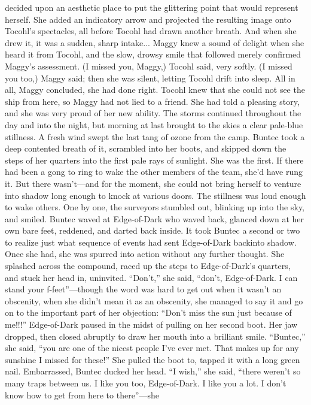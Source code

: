 \documentclass[9pt]{article}
\begin{document}
decided upon an aesthetic place to put the glittering point that would represent herself. She added an
indicatory arrow and projected the resulting image onto Tocohl’s spectacles, all before Tocohl had
drawn another breath.
And when she drew it, it was a sudden, sharp intake... Maggy knew a sound of delight when she
heard it from Tocohl, and the slow, drowsy smile that followed merely confirmed Maggy’s assessment.
(I missed you, Maggy,) Tocohl said, very softly.
(I missed you too,) Maggy said; then she was silent, letting Tocohl drift into sleep.
All in all, Maggy concluded, she had done right. Tocohl knew that she could not see the ship from
here, so Maggy had not lied to a friend. She had told a pleasing story, and she was very proud of her
new ability.
The storms continued throughout the day and into the night, but morning at last brought to the skies a
clear pale-blue stillness. A fresh wind swept the last tang of ozone from the camp. Buntec took a deep
contented breath of it, scrambled into her boots, and skipped down the steps of her quarters into the first
pale rays of sunlight.
She was the first. If there had been a gong to ring to wake the other members of the team, she’d
have rung it. But there wasn’t—and for the moment, she could not bring herself to venture into shadow
long enough to knock at various doors.
The stillness was loud enough to wake others. One by one, the surveyors stumbled out, blinking up
into the sky, and smiled. Buntec waved at Edge-of-Dark who waved back, glanced down at her own
bare feet, reddened, and darted back inside.
It took Buntec a second or two to realize just what sequence of events had sent Edge-of-Dark backinto shadow. Once she had, she was spurred into action without any further thought.
She splashed across the compound, raced up the steps to Edge-of-Dark’s quarters, and stuck her
head in, uninvited. “Don’t,” she said, “don’t, Edge-of-Dark. I can stand your f-feet”—though the word
was hard to get out when it wasn’t an obscenity, when she didn’t mean it as an obscenity, she managed
to say it and go on to the important part of her objection: “Don’t miss the sun just because of me!!!”
Edge-of-Dark paused in the midst of pulling on her second boot. Her jaw dropped, then closed
abruptly to draw her mouth into a brilliant smile. “Buntec,” she said, “you are one of the nicest people
I’ve ever met. That makes up for any sunshine I missed for these!” She pulled the boot to, tapped it with
a long green nail.
Embarrassed, Buntec ducked her head. “I wish,” she said, “there weren’t so many traps between us.
I like you too, Edge-of-Dark. I like you a lot. I don’t know how to get from here to there”—she
\end{document}

